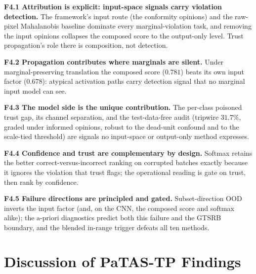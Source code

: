 \begin{tcolorbox}[title=Key findings -- Experiment 4, colback=gray!5,
colframe=gray!40, fonttitle=\bfseries, left=4pt, right=4pt,
top=4pt, bottom=4pt]

\textbf{F4.1 Attribution is explicit: input-space signals carry violation detection.} The framework's input route (the conformity opinions) and the raw-pixel Mahalanobis baseline dominate every marginal-violation task, and removing the input opinions collapses the composed score to the output-only level. Trust propagation's role there is composition, not detection.

\medskip
\textbf{F4.2 Propagation contributes where marginals are silent.} Under marginal-preserving translation the composed score ($0.781$) beats its own input factor ($0.678$): atypical activation paths carry detection signal that no marginal input model can see.

\medskip
\textbf{F4.3 The model side is the unique contribution.} The per-class poisoned trust gap, its channel separation, and the test-data-free audit (tripwire $31.7\%$, graded under informed opinions, robust to the dead-unit confound and to the scale-tied threshold) are signals no input-space or output-only method expresses.

\medskip
\textbf{F4.4 Confidence and trust are complementary by design.} Softmax retains the better correct-versus-incorrect ranking on corrupted batches exactly because it ignores the violation that trust flags; the operational reading is gate on trust, then rank by confidence.

\medskip
\textbf{F4.5 Failure directions are principled and gated.} Subset-direction \ac{OOD} inverts the input factor (and, on the \ac{CNN}, the composed score and softmax alike); the a-priori diagnostics predict both this failure and the GTSRB boundary, and the blended in-range trigger defeats all ten methods.
\end{tcolorbox}

\section{Discussion of \ac{PaTAS-TP} Findings}
\label{sec:patas-discussion}

